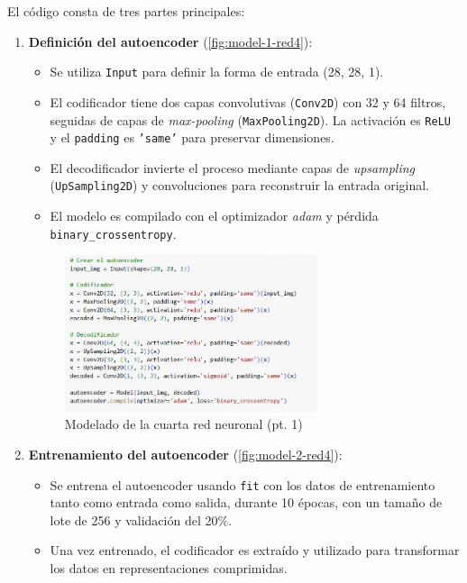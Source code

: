 El código consta de tres partes principales:
\begin{enumerate}
	\item \textbf{Definición del autoencoder} (\autoref{fig:model-1-red4}):
	\begin{itemize}
		\item Se utiliza \texttt{Input} para definir la forma de entrada (28, 28, 1).
		\item El codificador tiene dos capas convolutivas (\texttt{Conv2D}) con 32 y 64 filtros, seguidas de capas de \textit{max-pooling} (\texttt{MaxPooling2D}). La activación es \texttt{ReLU} y el \texttt{padding} es \texttt{'same'} para preservar dimensiones.
		\item El decodificador invierte el proceso mediante capas de \textit{upsampling} (\texttt{UpSampling2D}) y convoluciones para reconstruir la entrada original.
		\item El modelo es compilado con el optimizador \textit{adam} y pérdida \texttt{binary\_crossentropy}.
	\end{itemize}
	
	\begin{figure}[H]
		\centering
		\includegraphics[width=0.7\textwidth]{imgs/model-1-red4.JPG}
		\caption{Modelado de la cuarta red neuronal (pt. 1)}
		\label{fig:model-1-red4}
	\end{figure}
	
	\item \textbf{Entrenamiento del autoencoder} (\autoref{fig:model-2-red4}):
	\begin{itemize}
		\item Se entrena el autoencoder usando \texttt{fit} con los datos de entrenamiento tanto como entrada como salida, durante 10 épocas, con un tamaño de lote de 256 y validación del 20\%.
		\item Una vez entrenado, el codificador es extraído y utilizado para transformar los datos en representaciones comprimidas.
	\end{itemize}
	

\end{enumerate}
